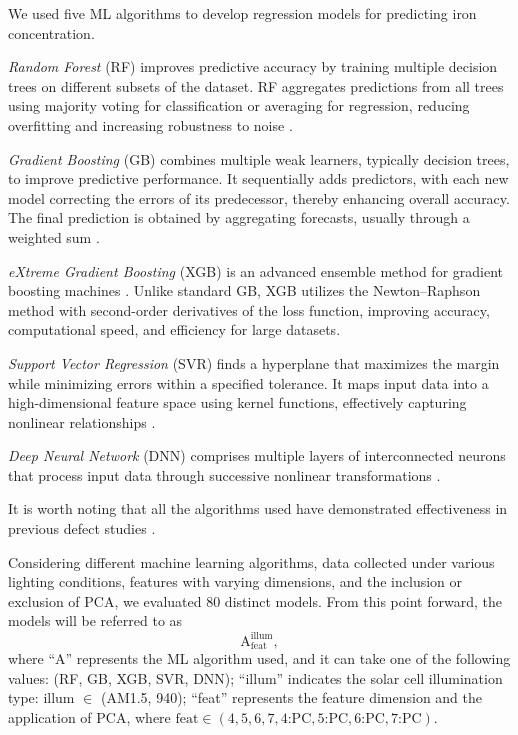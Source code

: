 \documentclass[a4paper,fleqn]{cas-sc}
\begin{document}
We used five ML algorithms to develop regression models for predicting iron concentration.

\emph{Random Forest} (RF) improves predictive accuracy by training multiple decision trees on different subsets of the dataset.
RF aggregates predictions from all trees using majority voting for classification or averaging for regression,
reducing overfitting and increasing robustness to noise \cite{Breiman2001}.

\emph{Gradient Boosting} (GB) combines multiple weak learners, typically decision trees, to improve predictive performance.
It sequentially adds predictors, with each new model correcting the errors of its predecessor, thereby enhancing overall accuracy.
The final prediction is obtained by aggregating forecasts, usually through a weighted sum \cite{Natekin2013}.

\emph{eXtreme Gradient Boosting} (XGB) is an advanced ensemble method for gradient boosting machines \cite{Akinpelu2024}.
Unlike standard GB, XGB utilizes the Newton–Raphson method with second-order derivatives of the loss function,
improving accuracy, computational speed, and efficiency for large datasets.

\emph{Support Vector Regression }(SVR) finds a hyperplane that maximizes the margin while minimizing errors within a specified tolerance.
It maps input data into a high-dimensional feature space using kernel functions, effectively capturing nonlinear relationships \cite{Cao2020}.

\emph{Deep Neural Network} (DNN) comprises multiple layers of interconnected neurons that process input data
through successive nonlinear transformations \cite{Liu2023}.

It is worth noting that all the algorithms used have demonstrated effectiveness in previous
defect studies \cite{Buratti2020a, Buratti2022, Olikh2022PPV, Buratti2024}.

Considering different machine learning algorithms, data collected under various lighting conditions,
features with varying dimensions, and the inclusion or exclusion of PCA, we evaluated 80 distinct models.
From this point forward, the models will be referred to as
\begin{equation*}
    \mathrm{A}^\mathrm{illum}_\mathrm{feat},
\end{equation*}
where ``A'' represents the ML algorithm used,
and it can take one of the following values: (RF, GB, XGB, SVR, DNN);
``illum'' indicates the solar cell illumination type: illum $\in$ (AM1.5, 940);
``feat'' represents the feature dimension and the application of PCA,
where $\mathrm{feat} \in (4, 5, 6, 7, 4\text{:PC}, 5\text{:PC}, 6\text{:PC}, 7\text{:PC})$.
\end{document}
